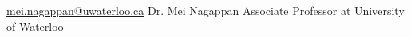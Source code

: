 

\begin{cventries}

  \cventry
    {\href{mailto:mei.nagappan@uwaterloo.ca}{mei.nagappan@uwaterloo.ca}} %
    {Dr. Mei Nagappan} %
    {Associate Professor at University of Waterloo} %
    {} %

\end{cventries}
